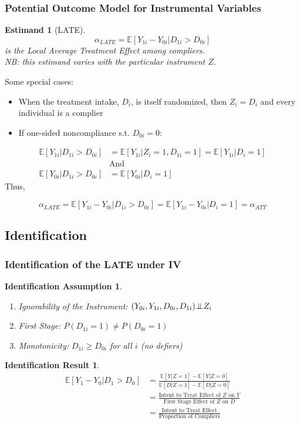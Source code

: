 \documentclass[xcolor=dvipsnames]{beamer}
\newtheorem{iass}{Identification Assumption}
\newtheorem{ires}{Identification Result}
\newtheorem{estm}{Estimand}
\newcommand{\E}{\mathbb{E}}
\newcommand{\indep}{{\bot\negthickspace\negthickspace\bot}}
\begin{document}
\begin{frame}
  \frametitle{Potential Outcome Model for Instrumental Variables}
\begin{estm}[LATE]
\small
$$\alpha_{LATE}=\E[Y_{1i}-Y_{0i}|D_{1i}>D_{0i}]$$ is the Local Average Treatment Effect among compliers.\\ \smallskip \footnotesize NB: this estimand varies with the particular instrument $Z$. 
\end{estm}
\normalsize
{} Some special cases: 
\footnotesize
\begin{itemize}
\item<2-> When the treatment intake, $D_i$, is itself randomized, \pause then $Z_i=D_i$ and every individual is a complier
\item<3-> If one-sided noncompliance s.t. $D_{0i}=0$: \pause
\end{itemize}
\begin{equation*}
\begin{split}
\E[Y_{1i}|D_{1i}>D_{0i}]&=\E[Y_{1i}|Z_i=1,D_{1i}=1]=\E[Y_{1i}|D_i=1]\\ 
&\mbox{And}\\
\E[Y_{0i}|D_{1i}>D_{0i}]&=\E[Y_{0i}|D_i=1]
\end{split}
\end{equation*}
Thus, 

$$\alpha_{LATE}=\E[Y_{1i}-Y_{0i}|D_{1i}>D_{0i}]=\E[Y_{1i}-Y_{0i}|D_i=1]=\alpha_{ATT}$$
\end{frame}

\subsection{Identification}

\begin{frame}
  \frametitle{Identification of the LATE under IV}
\begin{iass}
\small
\begin{enumerate}
  \item Ignorability of the Instrument: $(Y_{0i},Y_{1i}, D_{0i},D_{1i}) \indep Z_i$
  \item First Stage:  $P(D_{1i}=1) \neq P(D_{0i}=1)$
  \item Monotonicity: $D_{1i} \geq D_{0i}$ for all $i$ (no defiers)
  \end{enumerate}
\end{iass}\vspace{-.2in}
\bigskip
{}
\begin{ires}
\footnotesize
\begin{align*}
 \E[Y_1-Y_0|D_1>D_0] &= \frac{\E[Y|Z=1]-\E[Y|Z=0]}{\E[D|Z=1]-\E[D|Z=0]} \\
   &= \frac{\mbox{Intent to Treat Effect of $Z$ on $Y$}}{\mbox{First Stage Effect of $Z$ on $D$}} \\
   &= \frac{\mbox{Intent to Treat Effect}}{\mbox{Proportion of Compliers}}
\end{align*}
\end{ires}
\end{frame}
\end{document}
